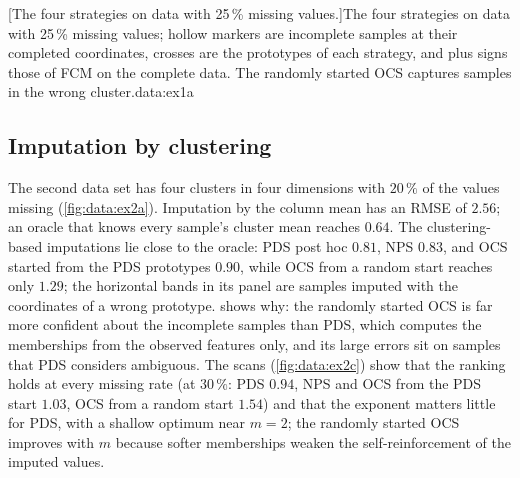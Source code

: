 [The four strategies on data with 25\,\% missing values.]{The four strategies on data with 25\,\% missing values; hollow markers are incomplete samples at their completed coordinates, crosses are the prototypes of each strategy, and plus signs those of FCM on the complete data. The randomly started OCS captures samples in the wrong cluster.}{data:ex1a}

\subsection{Imputation by clustering}

The second data set has four clusters in four dimensions with $20\,\%$ of the values missing (\cref{fig:data:ex2a}). Imputation by the column mean has an RMSE of $2.56$; an oracle that knows every sample's cluster mean reaches $0.64$. The clustering-based imputations lie close to the oracle: PDS post hoc $0.81$, NPS $0.83$, and OCS started from the PDS prototypes $0.90$, while OCS from a random start reaches only $1.29$; the horizontal bands in its panel are samples imputed with the coordinates of a wrong prototype.  shows why: the randomly started OCS is far more confident about the incomplete samples than PDS, which computes the memberships from the observed features only, and its large errors sit on samples that PDS considers ambiguous. The scans (\cref{fig:data:ex2c}) show that the ranking holds at every missing rate (at $30\,\%$: PDS $0.94$, NPS and OCS from the PDS start $1.03$, OCS from a random start $1.54$) and that the exponent matters little for PDS, with a shallow optimum near $m=2$; the randomly started OCS improves with $m$ because softer memberships weaken the self-reinforcement of the imputed values.


